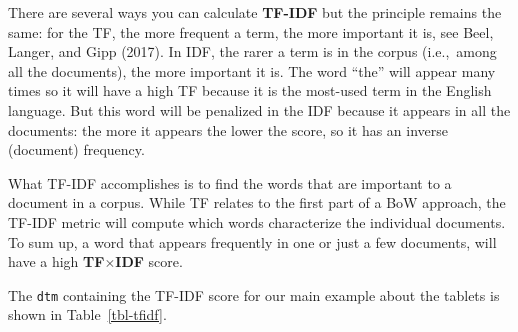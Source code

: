 There are several ways you can calculate \textbf{TF-IDF} but the
principle remains the same: for the TF, the more frequent a term,
the more important it is, see Beel, Langer, and Gipp (2017). In IDF, the
rarer a term is in the corpus (i.e.,~among all the documents), the more
important it is. The word ``the'' will appear many times so it
will have a high TF because it is the most-used term in the English
language. But this word will be penalized in the IDF because it appears
in all the documents: the more it appears the lower the score, so it has
an inverse (document) frequency.

What TF-IDF accomplishes is to find the words that are important to a
document in a corpus. While TF relates to the first part of a BoW
approach, the TF-IDF metric will compute which words characterize the individual
documents. To sum up, a word that appears frequently in one or just a
few documents, will have a high \textbf{TF}\textbf{\(\times\)IDF} score.

The \texttt{dtm} containing the TF-IDF score for our main example about
the tablets is shown in Table~\ref{tbl-tfidf}.

